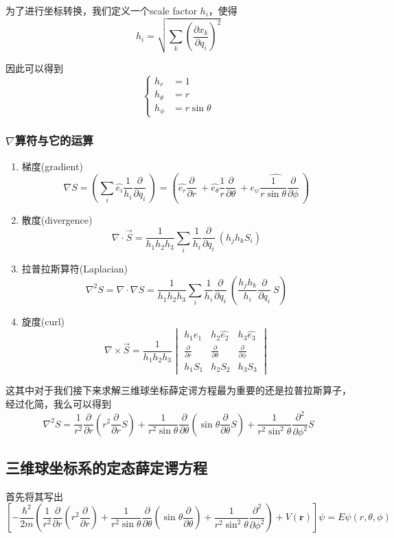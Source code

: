 \documentclass{article}
\newcommand{\vmthree}[9]{
    \begin{vmatrix}
        #1&#2&#3\\
        #4&#5&#6\\
        #7&#8&#9
    \end{vmatrix}
}
\newcommand{\Da}[2]{\frac{\partial}{\partial#2}#1}
\begin{document}
为了进行坐标转换，我们定义一个scale factor $h_i$，使得
\begin{equation*}
	h_i=\sqrt{\sum_{k}\left(\frac{\partial x_k}{\partial q_i}\right)^2}
\end{equation*}

因此可以得到
\[
	\begin{cases}
		h_r      & =1           \\
		h_\theta & =r           \\
		h_\phi   & =r\sin\theta
	\end{cases}
\]

\subsubsection{$\nabla$算符与它的运算}
\begin{enumerate}
	\item 梯度(gradient)
	      \begin{equation*}
		      \nabla S =\left(\sum_{i}\hat{e_i}\frac{1}{h_i}\Da{~}{q_i}\right)=\left(\hat{e_{r}}\Da{~}{r}+\hat{e_\theta}\frac{1}{r}\Da{~}{\theta}+\hat{e_\psi\frac{1}{r\sin\theta}\Da{~}{\phi}}\right)
	      \end{equation*}
	\item 散度(divergence)
	      \[
		      \nabla\cdot \vec{S}=\frac{1}{h_1h_2h_3}\sum_{i}\frac{1}{h_i}\Da{~}{q_i}(h_jh_kS_i)
	      \]
	\item 拉普拉斯算符(Laplacian)
	      \[
		      \nabla^2 S=\nabla\cdot\nabla S=\frac{1}{h_1h_2h_3}\sum_{i}\frac{1}{h_i}\Da{~}{q_i}\left(\frac{h_jh_k}{h_i}\Da{~}{q_i}S\right)
	      \]
	\item 旋度(curl)
	      \[
		      \nabla\times\vec{S}=\frac{1}{h_1h_2h_3}\vmthree{h_1\hat{e_1}}{h_2\hat{e_2}}{h_3\hat{e_3}}{\displaystyle\Da{~}{r}}{\displaystyle\Da{~}{\theta}}{\displaystyle\Da{~}{\phi}}{h_1S_1}{h_2S_2}{h_3S_3}
	      \]
\end{enumerate}

这其中对于我们接下来求解三维球坐标薛定谔方程最为重要的还是拉普拉斯算子，经过化简，我么可以得到
\[
	\nabla^2 S=\frac{1}{r^2}\frac{\partial}{\partial r}\left(r^2\frac{\partial}{\partial r}S\right)+\frac{1}{r^2\sin\theta}\frac{\partial}{\partial\theta}\left(\sin\theta\frac{\partial}{\partial\theta}S\right)+\frac{1}{r^2\sin^2\theta}\frac{\partial^2}{\partial\phi^2}S
\]

\subsection{三维球坐标系的定态薛定谔方程}
首先将其写出
\[
	\left[-\frac{\hbar^2}{2m}\left(\frac{1}{r^2}\frac{\partial}{\partial r}\left(r^2\frac{\partial}{\partial r}\right)+\frac{1}{r^2\sin\theta}\frac{\partial}{\partial\theta}\left(\sin\theta\frac{\partial}{\partial\theta}\right)+\frac{1}{r^2\sin^2\theta}\frac{\partial^2}{\partial\phi^2}\right)+V(\textbf{r})\right]\psi=E\psi(r,\theta,\phi)
\]
\end{document}
